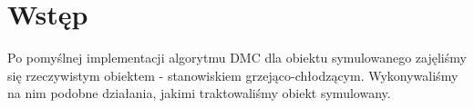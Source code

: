 \chapter{Wstęp}
Po pomyślnej implementacji algorytmu DMC dla obiektu symulowanego zajęliśmy się rzeczywistym obiektem - stanowiskiem grzejąco-chłodzącym. Wykonywaliśmy na nim podobne działania, jakimi traktowaliśmy obiekt symulowany.